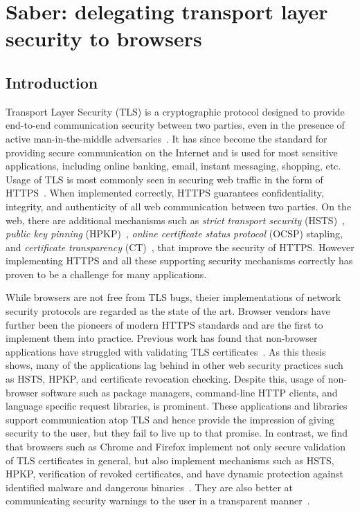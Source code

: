 \chapter{Saber: delegating transport layer security to browsers}
\label{ch:saber}

\section{Introduction}
\label{sec:intro-saber}

Transport Layer Security (TLS) is a cryptographic protocol designed to provide
end-to-end communication security between two parties, even in the presence of
active man-in-the-middle adversaries~\cite{RFC5246}. It has since become the
standard for providing secure communication on the Internet and is used for
most sensitive applications, including online banking, email, instant
messaging, shopping, etc. Usage of TLS is most commonly seen in securing web
traffic in the form of HTTPS~\cite{RFC2818}. When implemented correctly, HTTPS
guarantees confidentiality, integrity, and authenticity of all web
communication between two parties. On the web, there are additional mechanisms
such as \emph{strict transport security} (HSTS)~\cite{RFC6797}, \emph{public
key pinning} (HPKP)~\cite{RFC7469}, \emph{online certificate status protocol}
(OCSP) stapling, and \emph{certificate transparency} (CT)~\cite{RFC6962}, that
improve the security of HTTPS. However implementing HTTPS and all these
supporting security mechanisms correctly has proven to be a challenge for many
applications.

While browsers are not free from TLS bugs, theier implementations of network
security protocols are regarded as the state of the art. Browser vendors have
further been the pioneers of modern HTTPS standards and are the first to
implement them into practice. Previous work has found that non-browser
applications have struggled with validating TLS certificates~\cite{dangerous}.
As this thesis shows, many of the applications lag behind in other web security
practices such as HSTS, HPKP, and certificate revocation checking. Despite
this, usage of non-browser software such as package managers, command-line HTTP
clients, and language specific request libraries, is prominent. These
applications and libraries support communication atop TLS and hence provide the
impression of giving security to the user, but they fail to live up to that
promise. In contrast, we find that browsers such as Chrome and Firefox
implement not only secure validation of TLS certificates in general, but also
implement mechanisms such as HSTS, HPKP, verification of revoked
certificates, and have dynamic protection against identified malware and
dangerous binaries~\cite{safe-browsing}. They are also better at communicating
security warnings to the user in a transparent manner~\cite{improve-warnings}.

